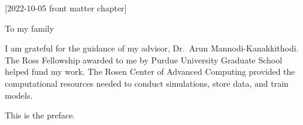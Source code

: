 [2022-10-05 front matter chapter]
%
%
%
%
%
%

%
%
%
\begin{statement}
\end{statement}

\begin{dedication}
  To my family
\end{dedication}

\begin{acknowledgments}
  I am grateful for the guidance of my advisor, Dr.~Arun
  Mannodi-Kanakkithodi.
  The Ross Fellowship awarded to me by Purdue University Graduate
  School helped fund my work.
  The Rosen Center of Advanced Computing provided the computational
  resources needed to conduct simulations, store data, and train models.
\end{acknowledgments}

\begin{preface}
  This is the preface.
\end{preface}

